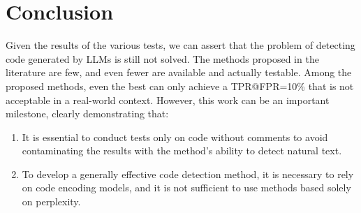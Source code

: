 \chapter{Conclusion}
Given the results of the various tests, we can assert that the problem 
of detecting code generated by LLMs is still not solved. The methods proposed 
in the literature are few, and even fewer are available and actually testable. 
Among the proposed methods, even the best can only achieve a TPR@FPR=10\% that 
is not acceptable in a real-world context. However, this work can be an important 
milestone, clearly demonstrating that:
\begin{enumerate}
\item It is essential to conduct tests only on code without comments to 
avoid contaminating the results with the method's ability to detect natural text.
\item To develop a generally effective code detection method, it is necessary 
to rely on code encoding models, and it is not sufficient to use methods 
based solely on perplexity.
\end{enumerate}

